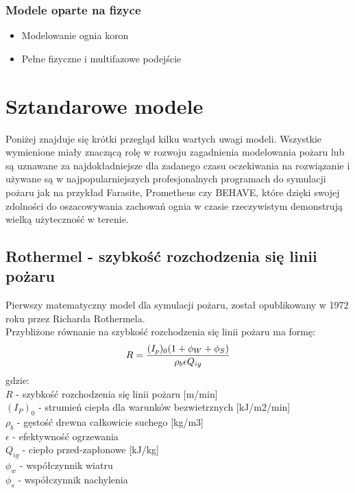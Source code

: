 \documentclass[a4paper, 11pt]{article}
\begin{document}
	\subsubsection*{Modele oparte na fizyce}
	\begin{itemize}
		\item Modelowanie ognia koron 
		\item Pełne fizyczne i multifazowe podejście
	\end{itemize}
	\fi
	
	\section* {Sztandarowe modele}
	\indent
	
	Poniżej znajduje się krótki przegląd kilku wartych uwagi modeli. Wszystkie wymienione miały znaczącą rolę w rozwoju zagadnienia modelowania pożaru lub są uznawane za najdokładniejsze dla zadanego czasu oczekiwania na rozwiązanie i używane są w najpopularniejszych profesjonalnych programach do symulacji pożaru jak na przykład Farasite, Prometheus czy BEHAVE, które dzięki swojej zdolności do oszacowywania zachowań ognia w czasie rzeczywistym demonstrują wielką użyteczność w terenie.
	\subsection{Rothermel - szybkość rozchodzenia się linii pożaru}
	\indent
	
	Pierwszy matematyczny model dla symulacji pożaru, został opublikowany w 1972 roku przez Richarda Rothermela.\\
	
	Przybliżone równanie na szybkość rozchodzenia się linii pożaru ma formę:
	$$
	R=\frac{(I_p)_{0}(1+\phi_W +\phi_S)}{\rho_b\epsilon Q_{ig}}\\
	$$
	gdzie:\\
	$R$	- szybkość rozchodzenia się linii pożaru	[m/min]\\
	$(I_P)_0$	- 	strumień ciepła dla warunków bezwietrznych	[kJ/m2/min]\\
	$\rho_b$	- 	gęstość drewna całkowicie suchego	[kg/m3]\\
	$\epsilon$ 	- efektywność ogrzewania	\\
	$Q_{ig}$	- 	ciepło przed-zapłonowe	[kJ/kg]\\
	$\phi_w$	- 	współczynnik wiatru	\\
	$\phi_s$	- 	współczynnik nachylenia\\
	
\end{document}
